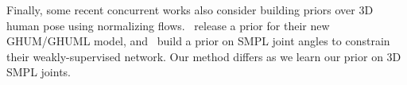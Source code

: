 Finally, some recent concurrent works also consider building priors over 3D human pose using normalizing flows.~\citet{xu-2020-cvpr} release a prior for their new GHUM/GHUML model, and~\citet{weakly-supervised-normflow} build a prior on SMPL joint angles to constrain their weakly-supervised network. Our method differs as we learn our prior on 3D SMPL joints.





